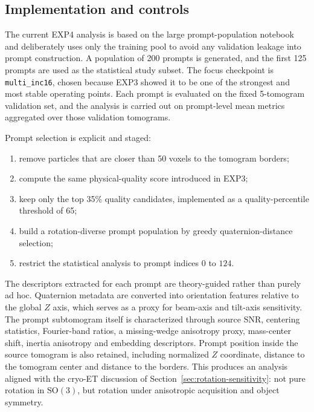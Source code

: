 \documentclass[12pt,a4paper]{report}
\begin{document}
\subsection{Implementation and controls}
The current EXP4 analysis is based on the large prompt-population notebook and deliberately uses only the training pool to avoid any validation leakage into prompt construction. A population of 200 prompts is generated, and the first 125 prompts are used as the statistical study subset. The focus checkpoint is \texttt{multi\_inc16}, chosen because EXP3 showed it to be one of the strongest and most stable operating points. Each prompt is evaluated on the fixed 5-tomogram validation set, and the analysis is carried out on prompt-level mean metrics aggregated over those validation tomograms.

Prompt selection is explicit and staged:
\begin{enumerate}
  \item remove particles that are closer than 50 voxels to the tomogram borders;
  \item compute the same physical-quality score introduced in EXP3;
  \item keep only the top 35\% quality candidates, implemented as a quality-percentile threshold of 65;
  \item build a rotation-diverse prompt population by greedy quaternion-distance selection;
  \item restrict the statistical analysis to prompt indices \(0\) to \(124\).
\end{enumerate}

The descriptors extracted for each prompt are theory-guided rather than purely ad hoc. Quaternion metadata are converted into orientation features relative to the global \(Z\) axis, which serves as a proxy for beam-axis and tilt-axis sensitivity. The prompt subtomogram itself is characterized through source SNR, centering statistics, Fourier-band ratios, a missing-wedge anisotropy proxy, mass-center shift, inertia anisotropy and embedding descriptors. Prompt position inside the source tomogram is also retained, including normalized \(Z\) coordinate, distance to the tomogram center and distance to the borders. This produces an analysis aligned with the cryo-ET discussion of Section~\ref{sec:rotation-sensitivity}: not pure rotation in \(\mathrm{SO}(3)\), but rotation under anisotropic acquisition and object symmetry.
\end{document}
